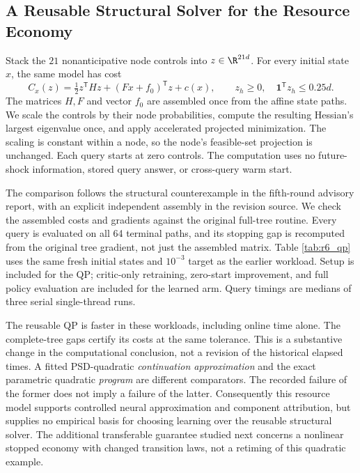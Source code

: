 \subsection{A Reusable Structural Solver for the Resource Economy}
\label{sec:structural_qp}
Stack the $21$ nonanticipative node controls into $z\in\R^{21d}$. For every initial state $x$, the same model has cost
\begin{equation}
 C_x(z)=\tfrac12z^{\mathsf T}Hz+(Fx+f_0)^{\mathsf T}z+c(x),
 \qquad z_h\geq0,\quad\mathbf1^{\mathsf T}z_h\leq0.25d.
 \label{eq:reusable_qp}
\end{equation}
The matrices $H,F$ and vector $f_0$ are assembled once from the affine state paths. We scale the controls by their node probabilities, compute the resulting Hessian's largest eigenvalue once, and apply accelerated projected minimization. The scaling is constant within a node, so the node's feasible-set projection is unchanged. Each query starts at zero controls. The computation uses no future-shock information, stored query answer, or cross-query warm start.

The comparison follows the structural counterexample in the fifth-round advisory report, with an explicit independent assembly in the revision source. We check the assembled costs and gradients against the original full-tree routine. Every query is evaluated on all 64 terminal paths, and its stopping gap is recomputed from the original tree gradient, not just the assembled matrix. Table \ref{tab:r6_qp} uses the same fresh initial states and $10^{-3}$ target as the earlier workload. Setup is included for the QP; critic-only retraining, zero-start improvement, and full policy evaluation are included for the learned arm. Query timings are medians of three serial single-thread runs.

The reusable QP is faster in these workloads, including online time alone. The complete-tree gaps certify its costs at the same tolerance. This is a substantive change in the computational conclusion, not a revision of the historical elapsed times. A fitted PSD-quadratic \emph{continuation approximation} and the exact parametric quadratic \emph{program} are different comparators. The recorded failure of the former does not imply a failure of the latter. Consequently this resource model supports controlled neural approximation and component attribution, but supplies no empirical basis for choosing learning over the reusable structural solver. The additional transferable guarantee studied next concerns a nonlinear stopped economy with changed transition laws, not a retiming of this quadratic example.

